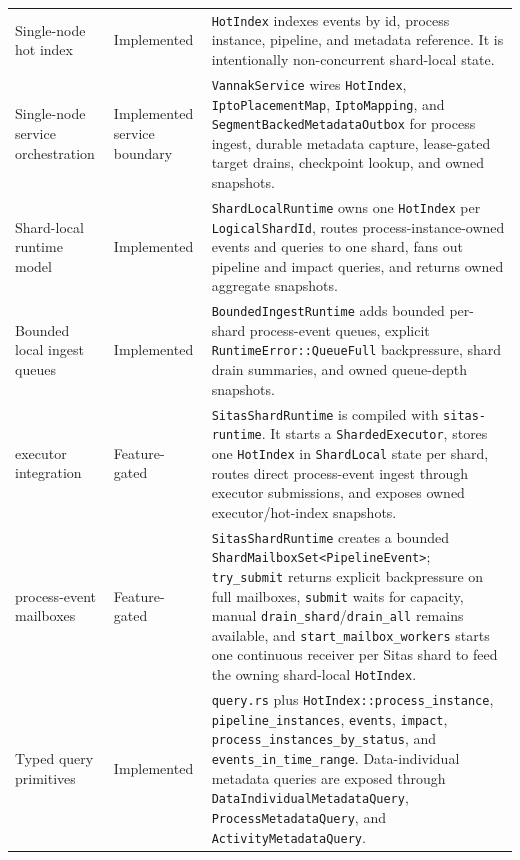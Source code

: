 \begin{longtable}{p{}p{}p{}}
Single-node hot index & Implemented &
\texttt{HotIndex} indexes events by id, process instance, pipeline, and
metadata reference. It is intentionally non-concurrent shard-local state. \\

Single-node service orchestration & Implemented service boundary &
\texttt{VannakService} wires \texttt{HotIndex}, \texttt{IptoPlacementMap},
\texttt{IptoMapping}, and \texttt{SegmentBackedMetadataOutbox} for process
ingest, durable metadata capture, lease-gated target drains, checkpoint lookup,
and owned snapshots. \\

Shard-local runtime model & Implemented &
\texttt{ShardLocalRuntime} owns one \texttt{HotIndex} per
\texttt{LogicalShardId}, routes process-instance-owned events and queries to
one shard, fans out pipeline and impact queries, and returns owned aggregate
snapshots. \\

Bounded local ingest queues & Implemented &
\texttt{BoundedIngestRuntime} adds bounded per-shard process-event queues,
explicit \texttt{RuntimeError::QueueFull} backpressure, shard drain summaries,
and owned queue-depth snapshots. \\

\sitas{} executor integration & Feature-gated &
\texttt{SitasShardRuntime} is compiled with \texttt{sitas-runtime}. It starts a
\sitas{} \texttt{ShardedExecutor}, stores one \texttt{HotIndex} in
\texttt{ShardLocal} state per shard, routes direct process-event ingest through
executor submissions, and exposes owned executor/hot-index snapshots. \\

\sitas{} process-event mailboxes & Feature-gated &
\texttt{SitasShardRuntime} creates a bounded
\texttt{ShardMailboxSet<PipelineEvent>}; \texttt{try\_submit} returns explicit
backpressure on full mailboxes, \texttt{submit} waits for capacity, manual
\texttt{drain\_shard}/\texttt{drain\_all} remains available, and
\texttt{start\_mailbox\_workers} starts one continuous receiver per Sitas shard
to feed the owning shard-local \texttt{HotIndex}. \\

Typed query primitives & Implemented &
\texttt{query.rs} plus \texttt{HotIndex::process\_instance},
\texttt{pipeline\_instances}, \texttt{events}, \texttt{impact},
\texttt{process\_instances\_by\_status}, and
\texttt{events\_in\_time\_range}. Data-individual metadata queries are exposed
through \texttt{DataIndividualMetadataQuery}, \texttt{ProcessMetadataQuery}, and
\texttt{ActivityMetadataQuery}. \\


\end{longtable}
